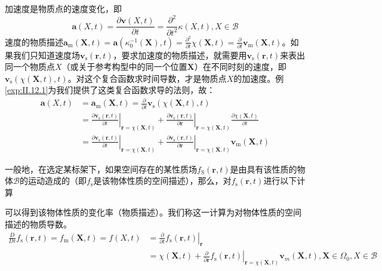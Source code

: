 \documentclass[main.tex]{subfiles}
\begin{document}
加速度是物质点的速度变化，即
\[\mathbf{a}\left(X,t\right)=\frac{\partial\mathbf{v}\left(X,t\right)}{\partial t}=\frac{\partial^2}{\partial t^2}\kappa\left(X,t\right),X\in\mathcal{B}\]
速度的物质描述$\mathbf{a}_\mathrm{m}\left(\mathbf{X},t\right)=\mathbf{a}\left(\kappa_0^{-1}\left(\mathbf{X}\right),t\right)=\frac{\partial^2}{\partial t}\chi\left(\mathbf{X},t\right)=\frac{\partial}{\partial t}\mathbf{v}_\mathrm{m}\left(\mathbf{X},t\right)$。如果我们只知道速度场$\mathbf{v}_\mathrm{s}\left(\mathbf{r},t\right)$，要求加速度的物质描述，就需要用$\mathbf{v}_\mathrm{s}\left(\mathbf{r},t\right)$来表出同一个物质点$X$（或关于参考构型中的同一个位置$\mathbf{X}$）在不同时刻的速度，即$\mathbf{v}_\mathrm{s}\left(\chi\left(\mathbf{X},t\right),t\right)$。对这个复合函数求时间导数，才是物质点$X$的加速度。例\ref{exp:II.12.1}为我们提供了这类复合函数求导的法则，故：
\begin{align*}
\mathbf{a}\left(X,t\right)&=\mathbf{a}_\mathrm{m}\left(\mathbf{X},t\right)=\frac{\partial}{\partial t}\mathbf{v}_\mathrm{s}\left(\chi\left(\mathbf{X},t\right),t\right)\\
&=\left.\frac{\partial \mathbf{v}_\mathrm{s}\left(\mathbf{r},t\right)}{\partial t}\right|_{\mathbf{r}=\chi\left(\mathbf{X},t\right)}+\left.\frac{\partial\mathbf{v}_\mathrm{s}\left(\mathbf{r},t\right)}{\partial\mathbf{r}}\right|_{\mathbf{r}=\chi\left(\mathbf{X},t\right)}\frac{\partial\chi\left(\mathbf{X},t\right)}{\partial t}\\
&=\left.\frac{\partial \mathbf{v}_\mathrm{s}\left(\mathbf{r},t\right)}{\partial t}\right|_{\mathbf{r}=\chi\left(\mathbf{X},t\right)}+\left.\frac{\partial\mathbf{v}_\mathrm{s}\left(\mathbf{r},t\right)}{\partial\mathbf{r}}\right|_{\mathbf{r}=\chi\left(\mathbf{X},t\right)}\mathbf{v}_\mathrm{m}\left(\mathbf{X},t\right)
\end{align*}

一般地，在选定某标架下，如果空间存在的某性质场$f_\mathrm{S}\left(\mathbf{r},t\right)$是由具有该性质的物体$\mathcal{B}$的运动造成的（即$f_\mathrm{s}$是该物体性质的空间描述），那么，对$f_\mathrm{s}\left(\mathbf{r},t\right)$进行以下计算

可以得到该物体性质的变化率（物质描述）。我们称这一计算为对物体性质的空间描述的物质导数。
\begin{align*}
    \frac{D}{Dt}f_\mathrm{s}\left(\mathbf{r},t\right)=f_\mathrm{m}\left(\mathbf{X},t\right)=f\left(X,t\right)
    &=\left.\frac{\partial}{\partial t}f_\mathrm{s}\left(\mathbf{r},t\right)\right|_{\mathbf{r}}\\
    &=\chi\left(\mathbf{X},t\right)+\left.\frac{\partial}{\partial \mathbf{r}}f_\mathrm{s}\left(\mathbf{r},t\right)\right|_{\mathbf{r}=\chi\left(\mathbf{X},t\right)}\mathbf{v}_m\left(\mathbf{X},t\right),\mathbf{X}\in\Omega_0,X\in\mathcal{B}
\end{align*}
\end{document}
